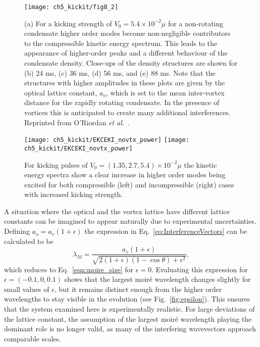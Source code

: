 \begin{figure}
    \centering
	\texttt{[image: ch5\_kickit/fig8\_2]}
	\caption[Higher order modes induced by stronger kicking.]{(a) For a kicking strength of $V_0 = 5.4\times10^{-2}\mu$ for a non-rotating condensate higher order modes become non-negligible contributors to the compressible kinetic energy spectrum. This leads to the appearance of higher-order peaks and a different behaviour of the condensate density. Close-ups of the density structures are shown for (b) 24 ms, (c) 36 ms, (d) 56 ms, and (e) 88 ms. Note that the structures with higher amplitudes in these plots are given by the optical lattice constant, $a_o$, which is set to the mean inter-vortex distance for the rapidly rotating condensate. In the presence of vortices this is anticipated to create many additional interferences. Reprinted from O'Riordan {\textit{et al}.}~\cite{VTX:oriordan_pra_2016}.}
	\label{fig:kickp20k}
\end{figure}
\begin{figure}
    \centering
    \texttt{[image: ch5\_kickit/EKCEKI\_novtx\_power]}
    \texttt{[image: ch5\_kickit/EKCEKI\_novtx\_power]}
	\caption[Comparison of kinetic energy spectra for increased kicking strengths.]{For kicking pulses of $V_0 = (1.35,2.7,5.4)\times 10^{-2} \mu$ the kinetic energy spectra show a clear increase in higher order modes being excited for both compressible (left) and incompressible (right) cases with increased kicking strength.}\label{fig:kick_compare_spec}
\end{figure}

    A situation where the optical and the vortex lattice have different lattice constants can be imagined to appear naturally due to experimental uncertainties. Defining $a_o = a_v(1+\epsilon)$ the expression in Eq.~\eqref{eq:InterferenceVectors} can be calculated to be
    \begin{equation}
    	\lambda_M = \frac{a_v(1+\epsilon)}{\sqrt{2(1+\epsilon)(1-\cos\theta) + \epsilon^2}},
    	\label{eqn:moire_size_eps}
    \end{equation}
    which reduces to Eq.~\eqref{eqn:moire_size} for $\epsilon=0$. Evaluating this expression for $\epsilon = (-0.1,0,0.1)$ shows that the largest moir\'e wavelength changes slightly for small values of $\epsilon$, but it remains distinct enough from the higher order wavelengths to stay visible in the evolution (see Fig.~\ref{fig:epsilon}). This ensures that the system examined here is experimentally realistic. For large deviations of the lattice constant, the assumption of the largest moir\'e wavelength playing the dominant role is no longer valid, as many of the interfering wavevectors approach comparable scales.

